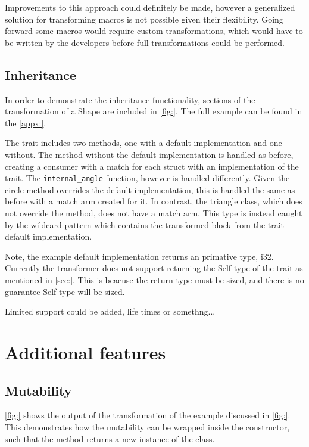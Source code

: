\documentclass[ oneside,%
                    author={James Elgar},
                    degree={MEng},
                     title={Bidirectional transformer between functional and \\ object-oriented programming in Rust},
                  subtitle={}]{dissertation}
\newcommand{\rust}[1]{\texttt{#1}}
\begin{document}
Improvements to this approach could definitely be made, however a generalized solution for transforming macros is not possible given their flexibility. Going forward some macros would require custom transformations, which would have to be written by the developers before full transformations could be performed. 

\subsection{Inheritance}

In order to demonstrate the inheritance functionality, sections of the transformation of a Shape are included in \autoref{fig:}. The full example can be found in the \autoref{appx:}.

The trait includes two methods, one with a default implementation and one without. The method without the default implementation is handled as before, creating a consumer with a match for each struct with an implementation of the trait. The \rust{internal_angle} function, however is handled differently. Given the circle method overrides the default implementation, this is handled the same as before with a match arm created for it. In contrast, the triangle class, which does not override the method, does not have a match arm. This type is instead caught by the wildcard pattern which contains the transformed block from the trait default implementation.   

Note, the example default implementation returns an primative type, i32. Currently the transformer does not support returning the Self type of the trait as mentioned in \autoref{sec:}. This is beacuse the return type must be sized, and there is no guarantee Self type will be sized. 

Limited support could be added, life times or somethng...

\section{Additional features} 

\subsection{Mutability}

\autoref{fig:} shows the output of the transformation of the example discussed in \autoref{fig:}. This demonstrates how the mutability can be wrapped inside the constructor, such that the method returns a new instance of the class.
\end{document}

